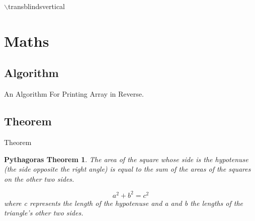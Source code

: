 \documentclass{beamer}
\newtheorem{thm}{Pythagoras Theorem}
\begin{document}
        \begin{frame}{$\backslash$transblindsvertical}
        \transblindsvertical
        \blindtext
        \end{frame}

        \section{Maths}
        \subsection{Algorithm}
        
        \begin{frame}[fragile]{An Algorithm For Printing Array in Reverse.}
        \begin{semiverbatim}

        \end{semiverbatim}
        
        \end{frame}
        
        \subsection{Theorem}
        \begin{frame}{Theorem}
            \begin{thm}
                 The area of the square whose side is the hypotenuse (the side opposite the right angle) is equal to the sum of the areas of the squares on the other two sides.
            
            \begin{equation}
                a^2 + b^2 = c^2
            \end{equation} 
            \centering
            where c represents the length of the hypotenuse and a and b the lengths of the triangle's other two sides.
            \end{thm}
        \end{frame}
        
\end{document}
